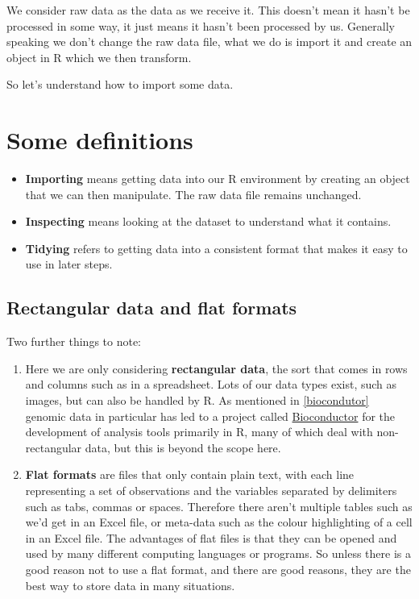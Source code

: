 \documentclass[12pt,]{book}
\providecommand{\tightlist}{%
  \setlength{\itemsep}{0pt}\setlength{\parskip}{0pt}}
\theoremstyle{definition}
\theoremstyle{definition}
\theoremstyle{definition}
\theoremstyle{remark}
\begin{document}
We consider raw data as the data as we receive it. This doesn't mean it
hasn't be processed in some way, it just means it hasn't been processed
by us. Generally speaking we don't change the raw data file, what we do
is import it and create an object in R which we then transform.

So let's understand how to import some data.

\section{Some definitions}\label{some-definitions}

\begin{itemize}
\tightlist
\item
  \textbf{Importing} means getting data into our R environment by
  creating an object that we can then manipulate. The raw data file
  remains unchanged.
\item
  \textbf{Inspecting} means looking at the dataset to understand what it
  contains.
\item
  \textbf{Tidying} refers to getting data into a consistent format that
  makes it easy to use in later steps.
\end{itemize}

\hypertarget{file-formats}{\subsection{Rectangular data and flat
formats}\label{file-formats}}

Two further things to note:

\begin{enumerate}
\def\labelenumi{\arabic{enumi}.}
\item
  Here we are only considering \textbf{rectangular data}, the sort that
  comes in rows and columns such as in a spreadsheet. Lots of our data
  types exist, such as images, but can also be handled by R. As
  mentioned in \ref{biocondutor} genomic data in particular has led to a
  project called \href{http://bioconductor.org/}{Bioconductor} for the
  development of analysis tools primarily in R, many of which deal with
  non-rectangular data, but this is beyond the scope here.
\item
  \textbf{Flat formats} are files that only contain plain text, with
  each line representing a set of observations and the variables
  separated by delimiters such as tabs, commas or spaces. Therefore
  there aren't multiple tables such as we'd get in an Excel file, or
  meta-data such as the colour highlighting of a cell in an Excel file.
  The advantages of flat files is that they can be opened and used by
  many different computing languages or programs. So unless there is a
  good reason not to use a flat format, and there are good reasons, they
  are the best way to store data in many situations.
\end{enumerate}
\end{document}

